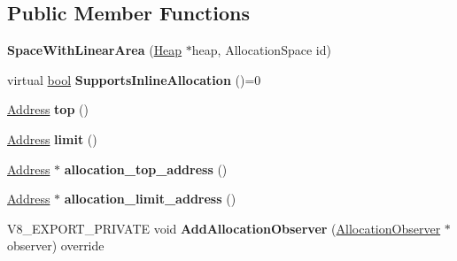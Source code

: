 \subsection*{Public Member Functions}
\begin{DoxyCompactItemize}
\item 
\mbox{\label{classv8_1_1internal_1_1SpaceWithLinearArea_a85da499b12cdb8a59b5e125c3be4e92c}} 
{\bfseries Space\+With\+Linear\+Area} (\mbox{\hyperlink{classv8_1_1internal_1_1Heap}{Heap}} $\ast$heap, Allocation\+Space id)
\item 
\mbox{\label{classv8_1_1internal_1_1SpaceWithLinearArea_a820ce506a31987161ceda6cfdafbd542}} 
virtual \mbox{\hyperlink{classbool}{bool}} {\bfseries Supports\+Inline\+Allocation} ()=0
\item 
\mbox{\label{classv8_1_1internal_1_1SpaceWithLinearArea_a9abd7cc862bdbbf377ca081eed1777d8}} 
\mbox{\hyperlink{classuintptr__t}{Address}} {\bfseries top} ()
\item 
\mbox{\label{classv8_1_1internal_1_1SpaceWithLinearArea_a838f9156dceb9961b794ce70830e04ff}} 
\mbox{\hyperlink{classuintptr__t}{Address}} {\bfseries limit} ()
\item 
\mbox{\label{classv8_1_1internal_1_1SpaceWithLinearArea_a54fb3593f5faa40c65e79f98af9b14fd}} 
\mbox{\hyperlink{classuintptr__t}{Address}} $\ast$ {\bfseries allocation\+\_\+top\+\_\+address} ()
\item 
\mbox{\label{classv8_1_1internal_1_1SpaceWithLinearArea_af97675a0f2e413ac8414fe8f70869cb1}} 
\mbox{\hyperlink{classuintptr__t}{Address}} $\ast$ {\bfseries allocation\+\_\+limit\+\_\+address} ()
\item 
\mbox{\label{classv8_1_1internal_1_1SpaceWithLinearArea_a5e6f2404d608d547bd258290444c036a}} 
V8\+\_\+\+E\+X\+P\+O\+R\+T\+\_\+\+P\+R\+I\+V\+A\+TE void {\bfseries Add\+Allocation\+Observer} (\mbox{\hyperlink{classv8_1_1internal_1_1AllocationObserver}{Allocation\+Observer}} $\ast$observer) override

\end{DoxyCompactItemize}

